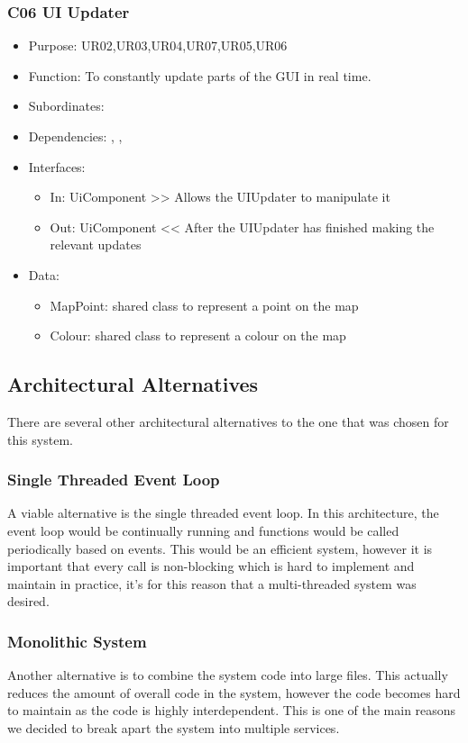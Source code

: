 \subsubsection{C06 UI Updater} \label{compUIUpdater}
\begin{itemize}
	\item Purpose: UR02,UR03,UR04,UR07,UR05,UR06
	\item Function: To constantly update parts of the GUI in real time. 
	\item Subordinates:
	\item Dependencies: , , 
	\item Interfaces:
	\begin{itemize}
		\item In: UiComponent >> Allows the UIUpdater to manipulate it
		\item Out: UiComponent << After the UIUpdater has finished making the relevant updates
	\end{itemize}
	\item Data:
	\begin{itemize}
		\item MapPoint: shared class to represent a point on the map
		\item Colour: shared class to represent a colour on the map
	\end{itemize}
\end{itemize}

\subsection{Architectural Alternatives}
There are several other architectural alternatives to the one that was chosen for this system. 

\subsubsection*{Single Threaded Event Loop}
A viable alternative is the single threaded event loop. In this architecture, the event loop would be continually running and functions would be called periodically based on events. This would be an efficient system, however it is important that every call is non-blocking which is hard to implement and maintain in practice, it's for this reason that a multi-threaded system was desired.

\subsubsection*{Monolithic System}
Another alternative is to combine the system code into large files. This actually reduces the amount of overall code in the system, however the code becomes hard to maintain as the code is highly interdependent. This is one of the main reasons we decided to break apart the system into multiple services.

